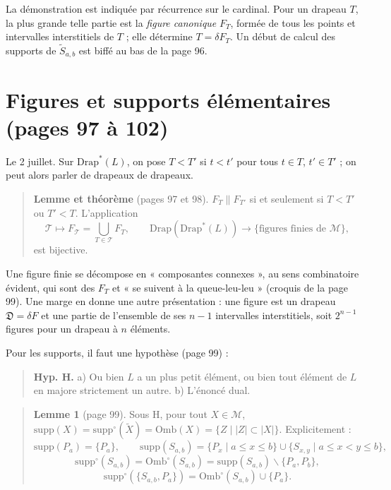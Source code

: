 \documentclass[11pt,a4paper]{article}
\begin{document}
La démonstration est indiquée par récurrence sur le cardinal. Pour un drapeau
$T$, la plus grande telle partie est la \emph{figure canonique} $F_{T}$, formée
de tous les points et intervalles interstitiels de $T$ ; elle détermine $T =
\delta F_{T}$. Un début de calcul des supports de $\widetilde{S}_{a,b}$ est
biffé au bas de la page 96.

\section*{Figures et supports élémentaires (pages 97 à 102)}

Le 2 juillet. Sur $\mathrm{Drap}^{*}(L)$, on pose $T < T'$ si $t < t'$ pour
tous $t \in T$, $t' \in T'$ ; on peut alors parler de drapeaux de drapeaux.

\begin{quote}
\textbf{Lemme et théorème} (pages 97 et 98). $F_{T} \parallel F_{T'}$ si et
seulement si $T < T'$ ou $T' < T$. L'application
\[
\mathcal{T} \longmapsto F_{\mathcal{T}} = \bigcup_{T \in \mathcal{T}} F_{T},
\qquad \mathrm{Drap}(\mathrm{Drap}^{*}(L)) \longrightarrow
\{\text{figures finies de } \mathcal{M}\},
\]
est bijective.
\end{quote}

Une figure finie se décompose en « composantes connexes », au sens combinatoire
évident, qui sont des $F_{T}$ et « se suivent à la queue-leu-leu » (croquis de
la page 99). Une marge en donne une autre présentation : une figure est un
drapeau $\mathfrak{D} = \delta F$ et une partie de l'ensemble de ses $n - 1$
intervalles interstitiels, soit $2^{n-1}$ figures pour un drapeau à $n$
éléments.

Pour les supports, il faut une hypothèse (page 99) :
\begin{quote}
\textbf{Hyp. H.} a) Ou bien $L$ a un plus petit élément, ou bien tout élément
de $L$ en majore strictement un autre. b) L'énoncé dual.
\end{quote}

\begin{quote}
\textbf{Lemme 1} (page 99). Sous H, pour tout $X \in \mathcal{M}$,
$\mathrm{supp}(X) = \mathrm{supp}^{\circ}(\widetilde{X}) = \mathrm{Omb}(X) =
\{Z \mid |Z| \subset |X|\}$. Explicitement :
\[
\mathrm{supp}(P_{a}) = \{P_{a}\}, \qquad \mathrm{supp}(S_{a,b}) = \{P_{x} \mid
a \leq x \leq b\} \cup \{S_{x,y} \mid a \leq x < y \leq b\},
\]
\[
\mathrm{supp}^{\circ}(S_{a,b}) = \mathrm{Omb}^{\circ}(S_{a,b}) =
\mathrm{supp}(S_{a,b}) \smallsetminus \{P_{a}, P_{b}\},
\]
\[
\mathrm{supp}^{\circ}(\{S_{a,b}, P_{a}\}) = \mathrm{Omb}^{\circ}(S_{a,b}) \cup
\{P_{a}\}.
\]
\end{quote}
\end{document}
